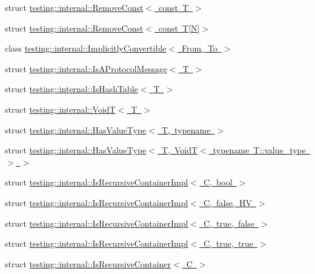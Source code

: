 \begin{DoxyCompactItemize}
struct \mbox{\hyperlink{structtesting_1_1internal_1_1_remove_const_3_01const_01_t_01_4}{testing\+::internal\+::\+Remove\+Const$<$ const T $>$}}
\item 
struct \mbox{\hyperlink{structtesting_1_1internal_1_1_remove_const_3_01const_01_t[_n]_4}{testing\+::internal\+::\+Remove\+Const$<$ const T\mbox{[}\+N\mbox{]}$>$}}
\item 
class \mbox{\hyperlink{classtesting_1_1internal_1_1_implicitly_convertible}{testing\+::internal\+::\+Implicitly\+Convertible$<$ From, To $>$}}
\item 
struct \mbox{\hyperlink{structtesting_1_1internal_1_1_is_a_protocol_message}{testing\+::internal\+::\+Is\+A\+Protocol\+Message$<$ T $>$}}
\item 
struct \mbox{\hyperlink{structtesting_1_1internal_1_1_is_hash_table}{testing\+::internal\+::\+Is\+Hash\+Table$<$ T $>$}}
\item 
struct \mbox{\hyperlink{structtesting_1_1internal_1_1_void_t}{testing\+::internal\+::\+Void\+T$<$ T $>$}}
\item 
struct \mbox{\hyperlink{structtesting_1_1internal_1_1_has_value_type}{testing\+::internal\+::\+Has\+Value\+Type$<$ T, typename $>$}}
\item 
struct \mbox{\hyperlink{structtesting_1_1internal_1_1_has_value_type_3_01_t_00_01_void_t_3_01typename_01_t_1_1value__type_01_4_01_4}{testing\+::internal\+::\+Has\+Value\+Type$<$ T, Void\+T$<$ typename T\+::value\+\_\+type $>$ $>$}}
\item 
struct \mbox{\hyperlink{structtesting_1_1internal_1_1_is_recursive_container_impl}{testing\+::internal\+::\+Is\+Recursive\+Container\+Impl$<$ C, bool $>$}}
\item 
struct \mbox{\hyperlink{structtesting_1_1internal_1_1_is_recursive_container_impl_3_01_c_00_01false_00_01_h_v_01_4}{testing\+::internal\+::\+Is\+Recursive\+Container\+Impl$<$ C, false, H\+V $>$}}
\item 
struct \mbox{\hyperlink{structtesting_1_1internal_1_1_is_recursive_container_impl_3_01_c_00_01true_00_01false_01_4}{testing\+::internal\+::\+Is\+Recursive\+Container\+Impl$<$ C, true, false $>$}}
\item 
struct \mbox{\hyperlink{structtesting_1_1internal_1_1_is_recursive_container_impl_3_01_c_00_01true_00_01true_01_4}{testing\+::internal\+::\+Is\+Recursive\+Container\+Impl$<$ C, true, true $>$}}
\item 
struct \mbox{\hyperlink{structtesting_1_1internal_1_1_is_recursive_container}{testing\+::internal\+::\+Is\+Recursive\+Container$<$ C $>$}}

\end{DoxyCompactItemize}
